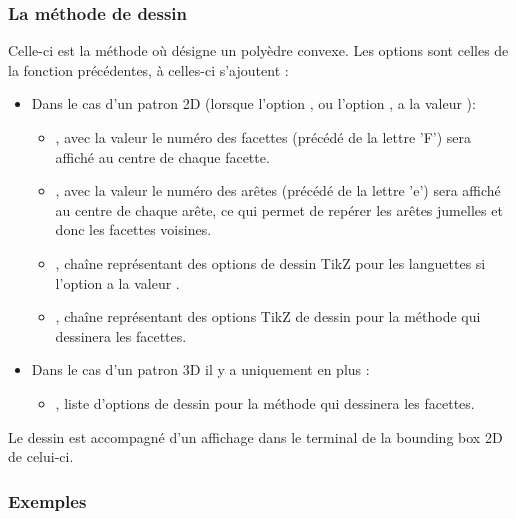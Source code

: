 \subsubsection{La méthode de dessin}

Celle-ci est la méthode  où  désigne un polyèdre convexe. Les options sont celles de la fonction précédentes, à celles-ci s'ajoutent :

    \begin{itemize}
        \item Dans le cas d'un patron 2D (lorsque l'option , ou l'option , a la valeur \true):
            \begin{itemize}
                \item {}, avec la valeur \true le numéro des facettes (précédé de la lettre 'F') sera affiché au centre de chaque facette.
                
                \item {},  avec la valeur \true le numéro des arêtes (précédé de la lettre 'e') sera affiché au centre de chaque arête, ce qui permet de repérer les arêtes jumelles et donc les facettes voisines.
                
                \item {}, chaîne représentant des options de dessin TikZ pour les languettes si l'option  a la valeur \true.
                
                \item {}, chaîne représentant des options TikZ de dessin pour la méthode  qui dessinera les facettes.                
            \end{itemize}
        \item Dans le cas d'un patron 3D il y a uniquement en plus :
            \begin{itemize}
                \item {}, liste d'options de dessin pour la méthode  qui dessinera les facettes. 
            \end{itemize}
    \end{itemize}

Le dessin est accompagné d'un affichage dans le terminal de la bounding box 2D de celui-ci.


\subsubsection{Exemples}

